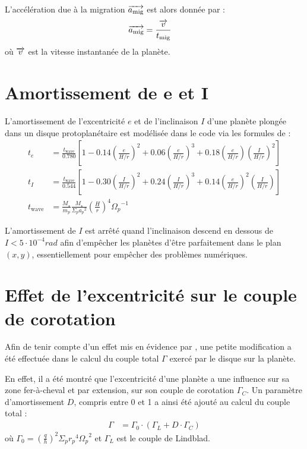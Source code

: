 L'accélération due à la migration ${\overrightarrow{a_\text{mig}}}$ est alors donnée par :
\begin{align}
{\overrightarrow{a_\text{mig}}} &= \frac{{\overrightarrow{v}}}{t_\text{mig}}
\end{align}
où ${\overrightarrow{v}}$ est la vitesse instantanée de la planète.

\section{Amortissement de e et I}
L'amortissement de l'excentricité $e$ et de l'inclinaison $I$ d'une planète plongée dans un disque protoplanétaire est modélisée dans le code via les formules de \cite[eq. (9), (11) et (12)]{cresswell2008three} : 
\begin{subequations}
\begin{align}
t_e &= \frac{t_\text{wave}}{0.780}\left[1-0.14\left(\frac{e}{H/r}\right)^2 + 0.06 \left(\frac{e}{H/r}\right)^3 + 0.18\left(\frac{e}{H/r}\right)\left(\frac{I}{H/r}\right)^2\right]\\
t_I &= \frac{t_\text{wave}}{0.544}\left[1-0.30\left(\frac{I}{H/r}\right)^2 + 0.24 \left(\frac{I}{H/r}\right)^3 + 0.14\left(\frac{e}{H/r}\right)^2\left(\frac{I}{H/r}\right)\right]\\
t_\text{wave} &= \frac{M_\star}{m_p}\frac{M_\star}{\Sigma_p {a_p}^2}\left(\frac{H}{r}\right)^4{\Omega_p}^{-1}
\end{align}
\end{subequations}

L'amortissement de $I$ est arrêté quand l'inclinaison descend en dessous de $I<5\cdot 10^{-4}\unit{rad}$ afin d'empêcher les planètes d'être parfaitement dans le plan $(x,y)$, essentiellement pour empêcher des problèmes numériques.

\section{Effet de l'excentricité sur le couple de corotation}
Afin de tenir compte d'un effet mis en évidence par \cite{bitsch2010orbital}, une petite modification a été effectuée dans le calcul du couple total $\Gamma$ exercé par le disque sur la planète. 

En effet, il a été montré que l'excentricité d'une planète a une influence sur sa zone fer-à-cheval et par extension, sur son couple de corotation $\Gamma_C$. Un paramètre d'amortissement $D$, compris entre 0 et 1 a ainsi été ajouté au calcul du couple total \citep{hellary2012global} :
\begin{align}
\Gamma &= \Gamma_0 \cdot (\Gamma_L + D\cdot \Gamma_C)
\end{align}
où $\Gamma_0 = \left(\frac{q}{h}\right)^2\Sigma_p {r_p}^4 {\Omega_p}^2$ et $\Gamma_L$ est le couple de Lindblad.

